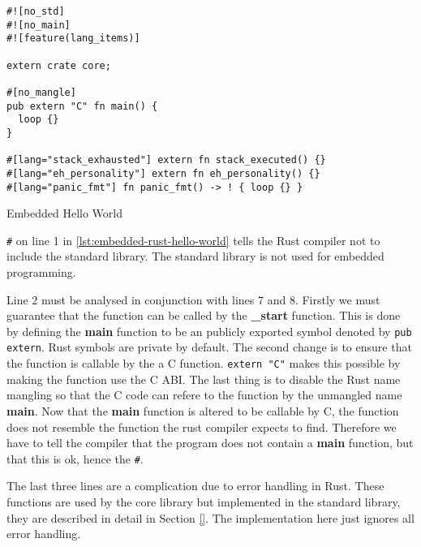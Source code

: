 \begin{listing}[H]
\begin{verbatim}
#![no_std]
#![no_main]
#![feature(lang_items)]

extern crate core;

#[no_mangle]
pub extern "C" fn main() {
  loop {}
}

#[lang="stack_exhausted"] extern fn stack_executed() {}
#[lang="eh_personality"] extern fn eh_personality() {}
#[lang="panic_fmt"] fn panic_fmt() -> ! { loop {} }
\end{verbatim}
\caption{Embedded Hello World}
\label{lst:embedded-rust-hello-world}
\end{listing}

\texttt{\#\![no\_std]} on line 1 in \autoref{lst:embedded-rust-hello-world} tells the Rust compiler not to include the standard library.
The standard library is not used for embedded programming. 

Line 2 must be analysed in conjunction with lines 7 and 8.
Firstly we must guarantee that the function can be called by the \textbf{\_start} function.
This is done by defining the \textbf{main} function to be an publicly exported symbol denoted by \texttt{pub extern}.
Rust symbols are private by default.
The second change is to ensure that the function is callable by the a C function.
\texttt{extern "C"} makes this possible by making the function use the C ABI. 
The last thing is to disable the Rust name mangling so that the C code can refere to the function by the unmangled name \textbf{main}.
Now that the \textbf{main} function is altered to be callable by C, the function does not resemble the function the rust compiler expects to find.
Therefore we have to tell the compiler that the program does not contain a \textbf{main} function, but that this is ok, hence the \texttt{\#\![no\_main]}.

The last three lines are a complication due to error handling in Rust.
These functions are used by the core library but implemented in the standard library, they are described in detail in Section \ref{}. 
The implementation here just ignores all error handling.

